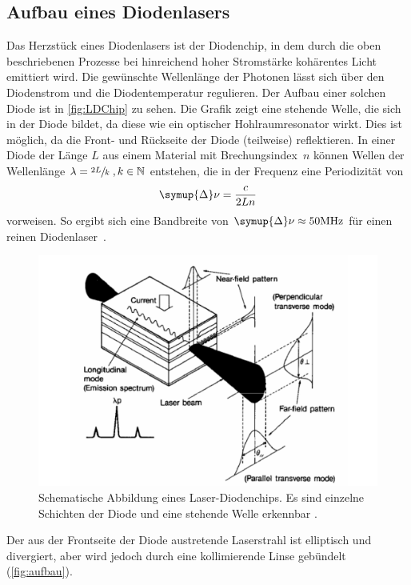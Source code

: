 \subsection{Aufbau eines Diodenlasers}
Das Herzstück eines Diodenlasers ist der Diodenchip, in dem durch die oben beschriebenen Prozesse bei hinreichend hoher Stromstärke kohärentes Licht emittiert wird. 
Die gewünschte Wellenlänge der Photonen lässt sich 
über den Diodenstrom und die Diodentemperatur regulieren. Der Aufbau einer solchen Diode ist in \autoref{fig:LDChip} zu sehen. Die Grafik zeigt eine stehende Welle, die sich in 
der Diode bildet, da diese wie ein optischer Hohlraumresonator wirkt. Dies ist möglich, da die Front- und Rückseite der Diode (teilweise) reflektieren. 
In einer Diode der Länge $L$ aus einem Material mit Brechungsindex~$n$ können Wellen der Wellenlänge $\lambda = \sfrac{2L}{k}  \;,k \in \mathbb{N}$ entstehen, die in der Frequenz 
eine Periodizität von 
\begin{equation}
    \label{eqn:delta_nu}
    \symup{\Delta} \nu = \frac{c}{2Ln}
\end{equation}  
vorweisen. So ergibt sich eine Bandbreite von $\symup{\Delta} \nu \approx 50 \unit{\mega\hertz}$ für einen reinen Diodenlaser~\cite{diode_laser_spectroscopy}. 

\begin{figure}
    \centering
    \includegraphics[scale=0.4]{content/pics/LDChip.png}
    \caption{Schematische Abbildung eines Laser-Diodenchips. Es sind einzelne Schichten der Diode und eine stehende Welle erkennbar \cite{diode_laser_spectroscopy}.}
    \label{fig:LDChip}
\end{figure}
Der aus der Frontseite der Diode austretende Laserstrahl ist elliptisch und divergiert, aber wird jedoch durch eine kollimierende Linse gebündelt (\autoref{fig:aufbau}). 

